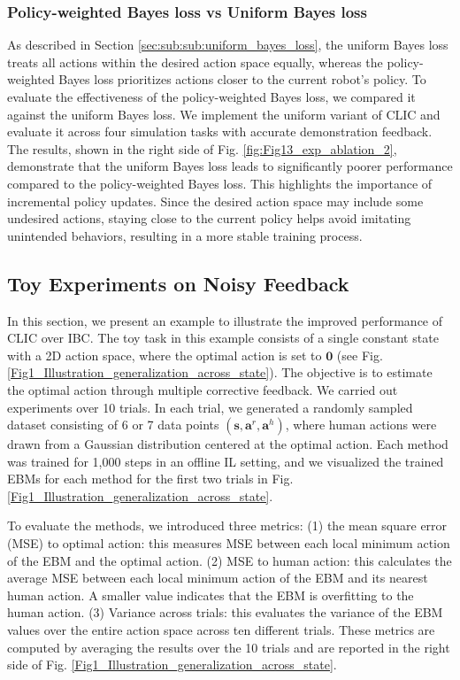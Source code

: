 \subsubsection{Policy-weighted Bayes loss vs Uniform Bayes loss}
As described in Section \ref{sec:sub:sub:uniform_bayes_loss}, the uniform Bayes loss treats all actions within the desired action space equally, whereas the policy-weighted Bayes loss prioritizes actions closer to the current robot's policy.
To evaluate the effectiveness of the policy-weighted Bayes loss, we compared it against the uniform Bayes loss.  We implement the uniform variant of CLIC and evaluate it across four simulation tasks with accurate demonstration feedback. The results, shown in the right side of Fig. \ref{fig:Fig13_exp_ablation_2}, demonstrate that the uniform Bayes loss leads to significantly poorer performance compared to the policy-weighted Bayes loss.
This highlights the importance of incremental policy updates. Since the desired action space may include some undesired actions, staying close to the current policy helps avoid imitating unintended behaviors, resulting in a more stable training process.

\subsection{Toy Experiments on Noisy Feedback}
\label{sec:exp:toy_exp}




In this section, we present an example to illustrate the improved performance of CLIC over IBC. The toy task in this example consists of a single constant state with a 2D action space, where the optimal action is set to $\bm{0}$ (see Fig. \ref{Fig1_Illustration_generalization_across_state}). 
The objective is to estimate the optimal action through multiple corrective feedback.
We carried out experiments over 10 trials. In each trial, we generated a randomly sampled dataset consisting of 6 or 7 data points $(\bm s, \bm a^r, \bm a^h)$, where human actions were drawn from a Gaussian distribution centered at the optimal action. 
Each method was trained for 1,000 steps in an offline IL setting, and we visualized the trained EBMs for each method for the first two trials in Fig. \ref{Fig1_Illustration_generalization_across_state}.

To evaluate the methods, we introduced three metrics: (1) the mean square error (MSE) to optimal action: this measures MSE between each local minimum action of the EBM and the optimal action. (2) MSE to human action: this calculates the average MSE between each local minimum action of the EBM and its nearest human action. A smaller value indicates that the EBM is overfitting to the human action. (3) Variance across trials: this evaluates the variance of the EBM values over the entire action space across ten different trials.
These metrics are computed by averaging the results over the 10 trials and are reported in the right side of Fig. \ref{Fig1_Illustration_generalization_across_state}.



